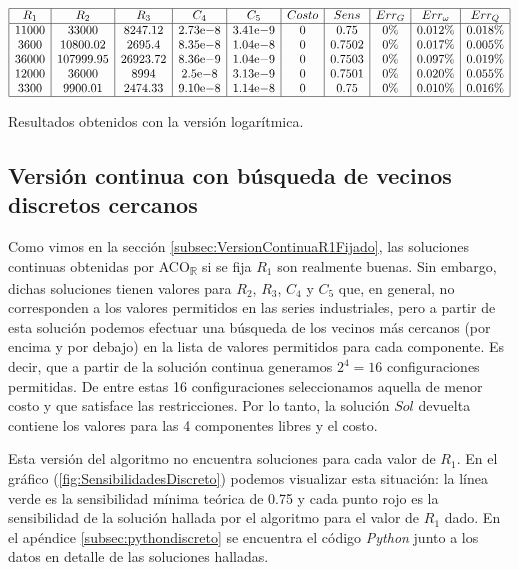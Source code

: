 \documentclass{llncs}
\newcommand{\expnumber}[2]{{#1}\mathrm{e}{#2}}
\begin{document}
	\begin{table}[H]
		$$
		\begin{array}{|c|c|c|c|c|c|c|c|c|c|}
		\hline
		R_1 & R_2 & R_3 & C_4 & C_5 & Costo  & Sens & Err_G & Err_\omega & Err_Q \\
		\hline
		11000 & 33000 & 8247.12 & \expnumber{2.73}{-8} & \expnumber{3.41}{-9} & 0 & 0.75 & 0\% & 0.012\% & 0.018\% \\
		3600 & 10800.02 & 2695.4 & \expnumber{8.35}{-8} & \expnumber{1.04}{-8} & 0 & 0.7502 & 0\% & 0.017\% & 0.005\% \\
		36000 & 107999.95 & 26923.72 & \expnumber{8.36}{-9} & \expnumber{1.04}{-9} & 0 & 0.7503 & 0\% & 0.097\% & 0.019\% \\
		12000 & 36000 & 8994 & \expnumber{2.5}{-8} & \expnumber{3.13}{-9} & 0 & 0.7501 & 0\% & 0.020\% & 0.055\% \\
		3300 & 9900.01 & 2474.33 & \expnumber{9.10}{-8} & \expnumber{1.14}{-8} & 0 & 0.75 & 0\% & 0.010\% & 0.016\% \\
		\hline
		\end{array}
		$$
		\caption{Resultados obtenidos con la versión logarítmica.}
		\label{cuadroSolsLog}
	\end{table}
	
	\subsection{Versión continua con búsqueda de vecinos discretos cercanos}
	\label{subsec:VersionDiscreta}
	Como vimos en la sección \ref{subsec:VersionContinuaR1Fijado}, las soluciones continuas obtenidas por ACO\textsubscript{$\mathbb{R}$} si se fija $R_1$ son realmente buenas. Sin embargo, dichas soluciones 
	tienen valores para $R_2$, $R_3$, $C_4$ y $C_5$ que, 
	en general, no corresponden a los valores permitidos en las series industriales, pero a partir de esta solución podemos efectuar 
	una búsqueda de los vecinos más cercanos (por encima y por debajo) en la lista de valores permitidos para cada 
	componente. Es decir, que a partir de la solución continua generamos $2^4 = 16$ configuraciones permitidas. 
	De entre estas 16 configuraciones seleccionamos aquella de menor costo y que satisface las restricciones.
	Por lo tanto, la solución $Sol$ devuelta contiene los valores para las 4 componentes libres y el costo.
	
	Esta versión del algoritmo no encuentra soluciones para cada valor de $R_1$. En el gráfico (\ref{fig:SensibilidadesDiscreto}) 
	podemos visualizar esta situación: la línea verde es la sensibilidad mínima teórica de 0.75 y cada punto rojo es la 
	sensibilidad de la solución hallada por el algoritmo para el valor de $R_1$ dado. En el apéndice \ref{subsec:pythondiscreto} se
	encuentra el código \textit{Python} junto a los datos en detalle de las soluciones halladas.
	
\end{document}
